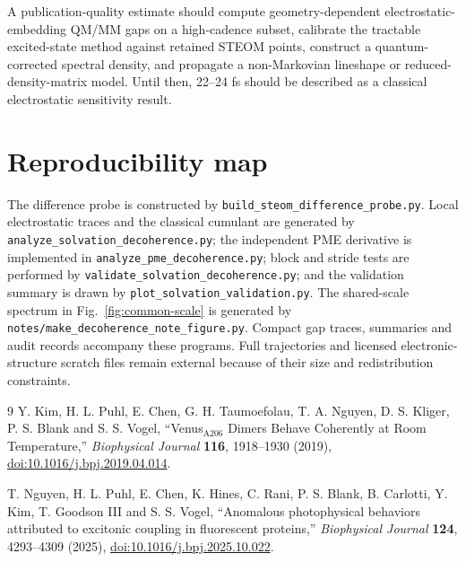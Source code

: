 \documentclass[11pt]{article}
\begin{document}
A publication-quality estimate should compute geometry-dependent
electrostatic-embedding QM/MM gaps on a high-cadence subset, calibrate the
tractable excited-state method against retained STEOM points, construct a
quantum-corrected spectral density, and propagate a non-Markovian lineshape or
reduced-density-matrix model.  Until then, 22--24 fs should be described as a
classical electrostatic sensitivity result.

\section{Reproducibility map}

The difference probe is constructed by
\texttt{build\_steom\_difference\_probe.py}.  Local electrostatic traces and
the classical cumulant are generated by
\texttt{analyze\_solvation\_decoherence.py}; the independent PME derivative is
implemented in \texttt{analyze\_pme\_decoherence.py}; block and stride tests are
performed by \texttt{validate\_solvation\_decoherence.py}; and the validation
summary is drawn by \texttt{plot\_solvation\_validation.py}.  The shared-scale
spectrum in Fig.~\ref{fig:common-scale} is generated by
\texttt{notes/make\_decoherence\_note\_figure.py}.  Compact gap traces,
summaries and audit records accompany these programs.  Full trajectories and
licensed electronic-structure scratch files remain external because of their
size and redistribution constraints.

\begin{thebibliography}{9}
Y. Kim, H. L. Puhl, E. Chen, G. H. Taumoefolau, T. A. Nguyen,
D. S. Kliger, P. S. Blank and S. S. Vogel,
``Venus$_{\mathrm{A206}}$ Dimers Behave Coherently at Room Temperature,''
\emph{Biophysical Journal} \textbf{116}, 1918--1930 (2019),
\href{https://doi.org/10.1016/j.bpj.2019.04.014}{doi:10.1016/j.bpj.2019.04.014}.

T. Nguyen, H. L. Puhl, E. Chen, K. Hines, C. Rani, P. S. Blank,
B. Carlotti, Y. Kim, T. Goodson III and S. S. Vogel,
``Anomalous photophysical behaviors attributed to excitonic coupling in
fluorescent proteins,'' \emph{Biophysical Journal} \textbf{124}, 4293--4309
(2025),
\href{https://doi.org/10.1016/j.bpj.2025.10.022}{doi:10.1016/j.bpj.2025.10.022}.
\end{thebibliography}
\end{document}
